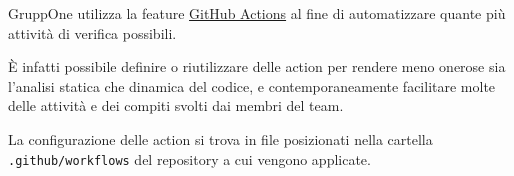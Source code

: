 \documentclass[../../norme-di-progetto.tex]{subfiles}
\begin{document}
GruppOne utilizza la feature \href{https://help.github.com/en/actions/automating-your-workflow-with-github-actions/about-github-actions}{GitHub Actions} al fine di automatizzare quante più attività di verifica possibili.

È infatti possibile definire o riutilizzare delle action per rendere meno onerose sia l'analisi statica che dinamica del codice, e contemporaneamente facilitare molte delle attività e dei compiti svolti dai membri del team.

La configurazione delle action si trova in file  posizionati nella cartella \verb|.github/workflows| del repository a cui vengono applicate.


\end{document}
